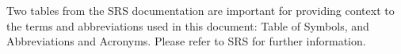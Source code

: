 \documentclass[12pt, titlepage]{article}
\begin{document}
Two tables from the SRS documentation \cite{SRS} are important for providing context to the terms  
and abbreviations used in this document: Table of Symbols, and Abbreviations and Acronyms. Please refer to SRS for further 
information.



\end{document}
